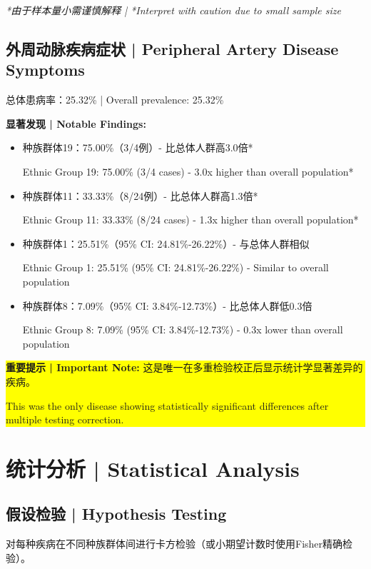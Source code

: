 \documentclass[12pt,a4paper]{article}
\begin{document}
\textit{*由于样本量小需谨慎解释 | *Interpret with caution due to small sample size}

\subsection{外周动脉疾病症状 | Peripheral Artery Disease Symptoms}

总体患病率：25.32\% | Overall prevalence: 25.32\%

\textbf{显著发现 | Notable Findings:}
\begin{itemize}
    \item 种族群体19：75.00\%（3/4例）- 比总体人群高3.0倍*
    
    Ethnic Group 19: 75.00\% (3/4 cases) - 3.0x higher than overall population*
    
    \item 种族群体11：33.33\%（8/24例）- 比总体人群高1.3倍*
    
    Ethnic Group 11: 33.33\% (8/24 cases) - 1.3x higher than overall population*
    
    \item 种族群体1：25.51\%（95\% CI: 24.81\%-26.22\%）- 与总体人群相似
    
    Ethnic Group 1: 25.51\% (95\% CI: 24.81\%-26.22\%) - Similar to overall population
    
    \item 种族群体8：7.09\%（95\% CI: 3.84\%-12.73\%）- 比总体人群低0.3倍
    
    Ethnic Group 8: 7.09\% (95\% CI: 3.84\%-12.73\%) - 0.3x lower than overall population
\end{itemize}

\colorbox{yellow}{\parbox{\textwidth}{
\textbf{重要提示 | Important Note:} 这是唯一在多重检验校正后显示统计学显著差异的疾病。

This was the only disease showing statistically significant differences after multiple testing correction.
}}

\section{统计分析 | Statistical Analysis}

\subsection{假设检验 | Hypothesis Testing}

对每种疾病在不同种族群体间进行卡方检验（或小期望计数时使用Fisher精确检验）。
\end{document}
